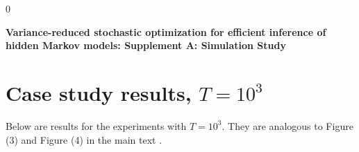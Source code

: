 \documentclass[12pt]{article}
\newcommand{\blind}{0}
\begin{document}
\blind
{
  \bigskip
  \bigskip
  \bigskip
  \begin{center}
    {\LARGE\bf Variance-reduced stochastic optimization for efficient inference of hidden Markov models: Supplement A: Simulation Study}
  \end{center}
  \medskip
} \fi


\newpage

\section{Case study results, $T = 10^{3}$}

Below are results for the experiments with $T=10^{3}$. They are analogous to Figure (3) and Figure (4) in the main text .
\end{document}

